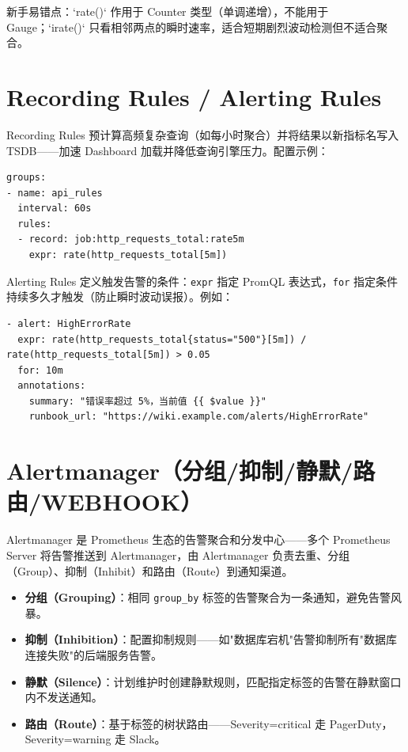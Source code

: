 \documentclass[12pt,UTF8]{ctexbook}
\begin{document}
新手易错点：`rate()` 作用于 Counter 类型（单调递增），不能用于 Gauge；`irate()` 只看相邻两点的瞬时速率，适合短期剧烈波动检测但不适合聚合。

  \section{Recording Rules / Alerting Rules}

Recording Rules 预计算高频复杂查询（如每小时聚合）并将结果以新指标名写入 TSDB——加速 Dashboard 加载并降低查询引擎压力。配置示例：

\begin{verbatim}
groups:
- name: api_rules
  interval: 60s
  rules:
  - record: job:http_requests_total:rate5m
    expr: rate(http_requests_total[5m])
\end{verbatim}

Alerting Rules 定义触发告警的条件：\texttt{expr} 指定 PromQL 表达式，\texttt{for} 指定条件持续多久才触发（防止瞬时波动误报）。例如：

\begin{verbatim}
- alert: HighErrorRate
  expr: rate(http_requests_total{status="500"}[5m]) / rate(http_requests_total[5m]) > 0.05
  for: 10m
  annotations:
    summary: "错误率超过 5%，当前值 {{ $value }}"
    runbook_url: "https://wiki.example.com/alerts/HighErrorRate"
\end{verbatim}

  \section{Alertmanager（分组/抑制/静默/路由/WEBHOOK）}

Alertmanager 是 Prometheus 生态的告警聚合和分发中心——多个 Prometheus Server 将告警推送到 Alertmanager，由 Alertmanager 负责去重、分组（Group）、抑制（Inhibit）和路由（Route）到通知渠道。

\begin{itemize}
	\item \textbf{分组（Grouping）}：相同 \texttt{group\_by} 标签的告警聚合为一条通知，避免告警风暴。
	\item \textbf{抑制（Inhibition）}：配置抑制规则——如"数据库宕机"告警抑制所有"数据库连接失败"的后端服务告警。
	\item \textbf{静默（Silence）}：计划维护时创建静默规则，匹配指定标签的告警在静默窗口内不发送通知。
	\item \textbf{路由（Route）}：基于标签的树状路由——Severity=critical 走 PagerDuty，Severity=warning 走 Slack。
\end{itemize}
\end{document}
